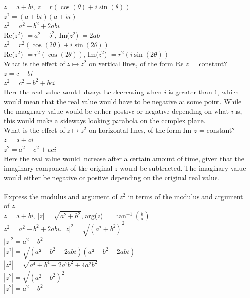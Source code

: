 \documentclass[12pt]{article}
\begin{document}
$z = a + bi$, $z = r(\cos(\theta) + i\sin(\theta))$\\

$z^2 = (a + bi)(a + bi)$\\
$z^2 = a^2 - b^2 + 2abi$\\
Re($z^2$) $ = a^2 - b^2$, Im($z^2$) $ = 2ab$\\

$z^2 = r^2(\cos(2\theta) + i\sin(2\theta))$\\
Re($z^2$) $ = r^2(\cos(2\theta))$, Im($z^2$) $ = r^2(i\sin(2\theta))$\\



 What is the effect of $z \mapsto z^2$ on vertical lines, of the form Re $z$ = constant?\\

$z = c + bi$\\
$z^2 = c^2 - b^2 + bci$\\

Here the real value would always be decreasing when $i$ is greater than 0, which would mean that the real value would have to be negative at some point.
While the imaginary value would be either postive or negative depending on what $i$ is, this would make a sideways looking parabola on the complex plane.\\


 What is the effect of $z \mapsto z^2$ on horizontal lines, of the form Im $z$ = constant?\\

$z = a + ci$\\
$z^2 = a^2 - c^2 + aci$\\

Here the real value would increase after a certain amount of time, given that the imaginary component of the original $z$ would be subtracted.
The imaginary value would either be negative or postive depending on the original real value.\\


\\


 Express the modulus and argument of $z^2$ in terms of the modulus and argument of $z$.\\


$z = a + bi$, $|z| = \sqrt{a^2+b^2}$, arg($z$) $ = \tan^{-1}(\frac{b}{a})$\\
$z^2 = a^2 - b^2 + 2abi$, $|z|^2 = \sqrt{(a^2 + b^2)}^2$\\
$|z|^2 = a^2 + b^2$\\
$|z^2| = \sqrt{(a^2-b^2+2abi)(a^2-b^2-2abi)}$\\
$|z^2| = \sqrt{a^4 + b^4 - 2a^2b^2 + 4a^2b^2}$\\
$|z^2| = \sqrt{(a^2+b^2)^2}$\\
$|z^2| = a^2+b^2$\\
\end{document}
